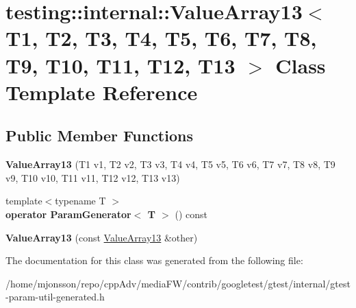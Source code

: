 \hypertarget{classtesting_1_1internal_1_1ValueArray13}{}\section{testing\+:\+:internal\+:\+:Value\+Array13$<$ T1, T2, T3, T4, T5, T6, T7, T8, T9, T10, T11, T12, T13 $>$ Class Template Reference}
\label{classtesting_1_1internal_1_1ValueArray13}
\subsection*{Public Member Functions}
\begin{DoxyCompactItemize}
\item 
\mbox{\label{classtesting_1_1internal_1_1ValueArray13_a57505ac7a4fbb86f4121bf1d41b0352d}} 
{\bfseries Value\+Array13} (T1 v1, T2 v2, T3 v3, T4 v4, T5 v5, T6 v6, T7 v7, T8 v8, T9 v9, T10 v10, T11 v11, T12 v12, T13 v13)
\item 
\mbox{\label{classtesting_1_1internal_1_1ValueArray13_a80572fc9c66a20824ae0934785b41f24}} 
{\footnotesize template$<$typename T $>$ }\\{\bfseries operator Param\+Generator$<$ T $>$} () const
\item 
\mbox{\label{classtesting_1_1internal_1_1ValueArray13_a150575c5629d3a589bf2baba0371b1da}} 
{\bfseries Value\+Array13} (const \hyperlink{classtesting_1_1internal_1_1ValueArray13}{Value\+Array13} \&other)
\end{DoxyCompactItemize}


The documentation for this class was generated from the following file\+:\begin{DoxyCompactItemize}
\item 
/home/mjonsson/repo/cpp\+Adv/media\+F\+W/contrib/googletest/gtest/internal/gtest-\/param-\/util-\/generated.\+h\end{DoxyCompactItemize}
